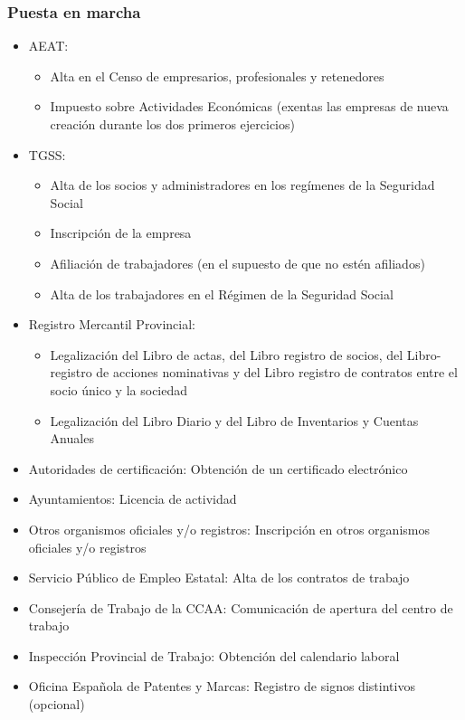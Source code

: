 \documentclass[12pt, a4paper]{book} %
\begin{document}
				\subsubsection{Puesta en marcha}
				\begin{itemize}
					\item AEAT:
					\begin{itemize}
						\item Alta en el Censo de empresarios, profesionales y retenedores
						\item Impuesto sobre Actividades Económicas (exentas las empresas de nueva creación durante los dos primeros ejercicios)
					\end{itemize}
					\item TGSS:
					\begin{itemize}
						\item Alta de los socios y administradores en los regímenes de la Seguridad Social
						\item Inscripción de la empresa
						\item Afiliación de trabajadores (en el supuesto de que no estén afiliados)
						\item Alta de los trabajadores en el Régimen de la Seguridad Social
					\end{itemize}
					\item Registro Mercantil Provincial:
					\begin{itemize}
						\item Legalización del Libro de actas, del Libro registro de socios, del Libro-registro de acciones nominativas y del Libro registro de contratos entre el socio único y la sociedad
						\item Legalización del Libro Diario y del Libro de Inventarios y Cuentas Anuales
					\end{itemize}
					\item Autoridades de certificación: Obtención de un certificado electrónico
					\item Ayuntamientos: Licencia de actividad
					\item Otros organismos oficiales y/o registros: Inscripción en otros organismos oficiales y/o registros
					\item Servicio Público de Empleo Estatal: Alta de los contratos de trabajo
					\item Consejería de Trabajo de la CCAA: Comunicación de apertura del centro de trabajo
					\item Inspección Provincial de Trabajo: Obtención del calendario laboral
					\item Oficina Española de Patentes y Marcas: Registro de signos distintivos (opcional)
				\end{itemize}
\end{document}
